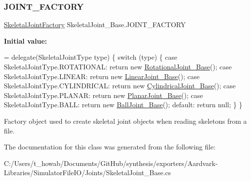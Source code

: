 \subsubsection{\texorpdfstring{J\+O\+I\+N\+T\+\_\+\+F\+A\+C\+T\+O\+RY}{JOINT\_FACTORY}}
{\footnotesize\ttfamily \hyperlink{class_skeletal_joint___base_aac5116bb70fb19058943811a19951848}{Skeletal\+Joint\+Factory} Skeletal\+Joint\+\_\+\+Base.\+J\+O\+I\+N\+T\+\_\+\+F\+A\+C\+T\+O\+RY\hspace{0.3cm}{\ttfamily [static]}}

{\bfseries Initial value\+:}
\begin{DoxyCode}
= delegate(SkeletalJointType type)
    \{
        \textcolor{keywordflow}{switch} (type)
        \{
            \textcolor{keywordflow}{case} SkeletalJointType.ROTATIONAL:
                \textcolor{keywordflow}{return} \textcolor{keyword}{new} \hyperlink{class_rotational_joint___base}{RotationalJoint\_Base}();
            \textcolor{keywordflow}{case} SkeletalJointType.LINEAR:
                \textcolor{keywordflow}{return} \textcolor{keyword}{new} \hyperlink{class_linear_joint___base}{LinearJoint\_Base}();
            \textcolor{keywordflow}{case} SkeletalJointType.CYLINDRICAL:
                \textcolor{keywordflow}{return} \textcolor{keyword}{new} \hyperlink{class_cylindrical_joint___base}{CylindricalJoint\_Base}();
            \textcolor{keywordflow}{case} SkeletalJointType.PLANAR:
                \textcolor{keywordflow}{return} \textcolor{keyword}{new} \hyperlink{class_planar_joint___base}{PlanarJoint\_Base}();
            \textcolor{keywordflow}{case} SkeletalJointType.BALL:
                \textcolor{keywordflow}{return} \textcolor{keyword}{new} \hyperlink{class_ball_joint___base}{BallJoint\_Base}();
            \textcolor{keywordflow}{default}:
                \textcolor{keywordflow}{return} null;
        \}
    \}
\end{DoxyCode}


Factory object used to create skeletal joint objects when reading skeletons from a file. 



The documentation for this class was generated from the following file\+:\begin{DoxyCompactItemize}
\item 
C\+:/\+Users/t\+\_\+howab/\+Documents/\+Git\+Hub/synthesis/exporters/\+Aardvark-\/\+Libraries/\+Simulator\+File\+I\+O/\+Joints/Skeletal\+Joint\+\_\+\+Base.\+cs\end{DoxyCompactItemize}
